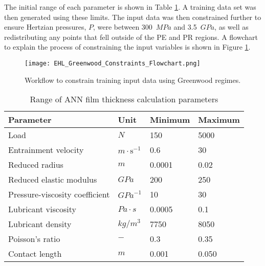 The initial range of each parameter is shown in Table \ref{Range of ANN film thickness calculation parameters}. A training data set was then generated using these limits. The input data was then constrained further to ensure Hertzian pressures, $P$, were between 300~$MPa$ and 3.5~$GPa$, as well as redistributing any points that fell outside of the PE and PR regions. A flowchart to explain the process of constraining the input variables is shown in Figure \ref{EHL_Greenwood_Constraints_Flowchart}.

\begin{figure}
	\centering  
	\texttt{[image: EHL\_Greenwood\_Constraints\_Flowchart.png]}
	\caption{Workflow to constrain training input data using Greenwood regimes.}
	\label{EHL_Greenwood_Constraints_Flowchart}
\end{figure} 



\begin{table*}
	\caption{Range of ANN film thickness calculation parameters}
	\label{Range of ANN film thickness calculation parameters}
	\centering
	\renewcommand{\arraystretch}{1.5}%
	\begin{tabular}{|P{0.4\textwidth}|P{0.15\textwidth}|P{0.15\textwidth}|P{0.15\textwidth}|}
		\hline
		\textbf{Parameter} & \textbf{Unit} & \textbf{Minimum} & \textbf{Maximum} \\ [0.5ex]
		\hline
		Load & $N$ & 150 & 5000 \\ [0.5ex]
		\hline
		Entrainment velocity & $m \cdot \mathrm{s}^{-1}$ & 0.6 & 30 \\ [0.5ex]
		\hline
		Reduced radius & $m$ & 0.0001 & 0.02 \\ [0.5ex]
		\hline
		Reduced elastic modulus & $GPa$ & 200 & 250 \\ [0.5ex]
		\hline
		Pressure-viscosity coefficient & ${GPa}^{-1}$ & 10 & 30 \\ [0.5ex]
		\hline
		Lubricant viscosity & $Pa \cdot s$ & 0.0005 & 0.1 \\ [0.5ex]
		\hline
		Lubricant density & ${kg}/{m}^3$ & 7750 & 8050 \\ [0.5ex]
		\hline
		Poisson's ratio & $-$ & 0.3 & 0.35 \\ [0.5ex]
		\hline
		Contact length & $m$ & 0.001 & 0.050 \\ [0.5ex]
		\hline
		
	\end{tabular}
\end{table*}

